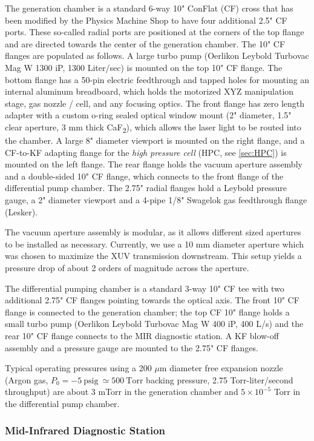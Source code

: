 The generation chamber is a standard 6-way 10" ConFlat (CF) cross that has been modified by the Physics Machine Shop to have four additional 2.5" CF ports. These so-called radial ports are positioned at the corners of the top flange and are directed towards the center of the generation chamber. The 10" CF flanges are populated as follows. A large turbo pump (Oerlikon Leybold Turbovac Mag W 1300 iP, 1300 Liter/sec) is mounted on the top 10" CF flange. The bottom flange has a 50-pin electric feedthrough and tapped holes for mounting an internal aluminum breadboard, which holds the motorized XYZ manipulation stage, gas nozzle / cell, and any focusing optics. The front flange has zero length adapter with a custom o-ring sealed optical window mount (2" diameter, 1.5" clear aperture, 3 mm thick CaF\textsubscript{2}), which allows the laser light to be routed into the chamber. A large 8" diameter viewport is mounted on the right flange, and a CF-to-KF adapting flange for the \textit{high pressure cell} (HPC, see \cref{sec:HPC}) is mounted on the left flange. The rear flange holds the vacuum aperture assembly and a double-sided 10" CF flange, which connects to the front flange of the differential pump chamber. The 2.75" radial flanges hold a Leybold pressure gauge, a 2" diameter viewport and a 4-pipe 1/8" Swagelok gas feedthrough flange (Lesker).

The vacuum aperture assembly is modular, as it allows different sized apertures to be installed as necessary. Currently, we use a 10 mm diameter aperture which was chosen to maximize the XUV transmission downstream. This setup yields a pressure drop of about 2 orders of magnitude across the aperture.

The differential pumping chamber is a standard 3-way 10" CF tee with two additional 2.75" CF flanges pointing towards the optical axis. The front 10" CF flange is connected to the generation chamber; the top CF 10" flange holds a small turbo pump (Oerlikon Leybold Turbovac Mag W 400 iP, 400 L/s) and the rear 10" CF flange connects to the MIR diagnostic station. A KF blow-off assembly and a pressure gauge are mounted to the 2.75" CF flanges.

Typical operating pressures using a 200 $\mu$m diameter free expansion nozzle (Argon gas, $P_0 = -5 \ \textrm{psig} \ \simeq 500 \ \textrm{Torr}$ backing pressure, 2.75 Torr-liter/second throughput) are about 3 mTorr in the generation chamber and $5 \times 10^{-5}$ Torr in the differential pump chamber.

\subsubsection{Mid-Infrared Diagnostic Station}

